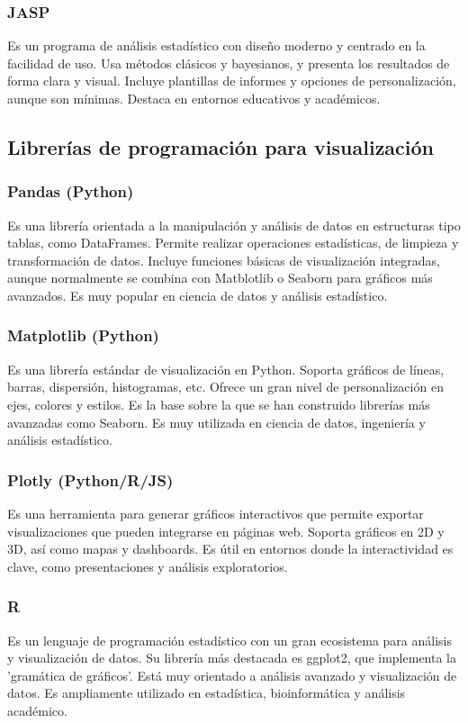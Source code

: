 \documentclass{../../miPlantilla}
\begin{document}
\subsubsection{JASP}
Es un programa de análisis estadístico con diseño moderno y centrado en la facilidad de uso. Usa métodos clásicos y bayesianos,
y presenta los resultados de forma clara y visual. Incluye plantillas de informes y opciones de personalización, aunque son mínimas.
Destaca en entornos educativos y académicos.

\newpage

\subsection{Librerías de programación para visualización}

\subsubsection{Pandas (Python)}
Es una librería orientada a la manipulación y análisis de datos en estructuras tipo tablas, como DataFrames. Permite realizar
operaciones estadísticas, de limpieza y transformación de datos. Incluye funciones básicas de visualización integradas, aunque
normalmente se combina con Matblotlib o Seaborn para gráficos más avanzados. Es muy popular en ciencia de datos y análisis estadístico.

\subsubsection{Matplotlib (Python)}
Es una librería estándar de visualización en Python. Soporta gráficos de líneas, barras, dispersión, histogramas, etc. Ofrece un gran
nivel de personalización en ejes, colores y estilos. Es la base sobre la que se han construido librerías más avanzadas como Seaborn.
Es muy utilizada en ciencia de datos, ingeniería y análisis estadístico.

\subsubsection{Plotly (Python/R/JS)}
Es una herramienta para generar gráficos interactivos que permite exportar visualizaciones que pueden integrarse en páginas web. Soporta
gráficos en 2D y 3D, así como mapas y dashboards. Es útil en entornos donde la interactividad es clave, como presentaciones y análisis exploratorios.

\subsubsection{R}
Es un lenguaje de programación estadístico con un gran ecosistema para análisis y visualización de datos. Su librería más destacada es ggplot2,
que implementa la 'gramática de gráficos'. Está muy orientado a análisis avanzado y visualización de datos. Es ampliamente utilizado en estadística,
bioinformática y análisis académico.
\end{document}
